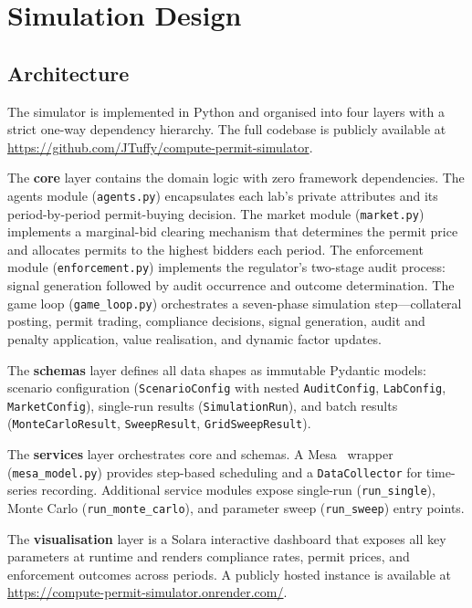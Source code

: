 \section{Simulation Design}

\subsection{Architecture}


The simulator is implemented in Python and organised into four layers with a strict one-way dependency hierarchy. The full codebase is publicly available at
\url{https://github.com/JTuffy/compute-permit-simulator}.

The \textbf{core} layer contains the domain logic with zero framework dependencies. The agents module (\texttt{agents.py}) encapsulates each lab's private attributes and its period-by-period permit-buying decision. The market module (\texttt{market.py}) implements a marginal-bid clearing mechanism that determines the permit price and allocates permits to the highest bidders each period. The enforcement module (\texttt{enforcement.py}) implements the regulator's two-stage audit process: signal generation followed by audit occurrence and outcome determination. The game loop (\texttt{game\_loop.py}) orchestrates a seven-phase simulation step---collateral posting, permit trading, compliance decisions, signal generation, audit and penalty application, value realisation, and dynamic factor updates.

The \textbf{schemas} layer defines all data shapes as immutable Pydantic models: scenario configuration (\texttt{ScenarioConfig} with nested \texttt{AuditConfig}, \texttt{LabConfig}, \texttt{MarketConfig}), single-run results (\texttt{SimulationRun}), and batch results (\texttt{MonteCarloResult}, \texttt{SweepResult}, \texttt{GridSweepResult}).

The \textbf{services} layer orchestrates core and schemas. A Mesa~\cite{ter2025mesa} wrapper (\texttt{mesa\_model.py}) provides step-based scheduling and a \texttt{DataCollector} for time-series recording. Additional service modules expose single-run (\texttt{run\_single}), Monte Carlo (\texttt{run\_monte\_carlo}), and parameter sweep (\texttt{run\_sweep}) entry points.

The \textbf{visualisation} layer is a Solara interactive dashboard that exposes all key parameters at runtime and renders compliance rates, permit prices, and enforcement outcomes across periods. A publicly hosted instance is available at \url{https://compute-permit-simulator.onrender.com/}.

